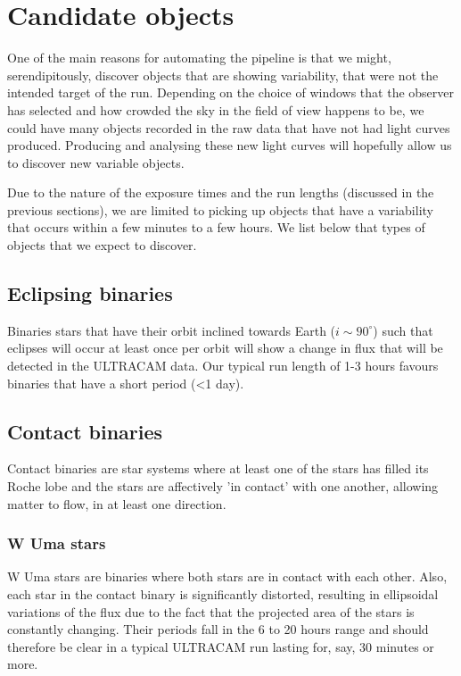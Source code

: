 \section{Candidate objects}

One of the main reasons for automating the pipeline is that we might, serendipitously, discover objects that are showing variability, that were not the intended target of the run. Depending on the choice of windows that the observer has selected and how crowded the sky in the field of view happens to be, we could have many objects recorded in the raw data that have not had light curves produced. Producing and analysing these new light curves will hopefully allow us to discover new variable objects. 

Due to the nature of the exposure times and the run lengths (discussed in the previous sections), we are limited to picking up objects that have a variability that occurs within a few minutes to a few hours. We list below that types of objects that we expect to discover.

\subsection{Eclipsing binaries}
Binaries stars that have their orbit inclined towards Earth ($i \sim 90^\circ$) such that eclipses will occur at least once per orbit will show a change in flux that will be detected in the ULTRACAM data. Our typical run length of 1-3 hours favours binaries that have a short period (\textless 1 day). 

\subsection{Contact binaries}
Contact binaries are star systems where at least one of the stars has filled its Roche lobe and the stars are affectively 'in contact' with one another, allowing matter to flow, in at least one direction. 

\subsubsection{W Uma stars}
W Uma stars are binaries where both stars are in contact with each other. Also, each star in the contact binary is significantly distorted, resulting in ellipsoidal variations of the flux due to the fact that the projected area of the stars is constantly changing. Their periods fall in the 6 to 20 hours range and should therefore be clear in a typical ULTRACAM run lasting for, say, 30 minutes or more. 


